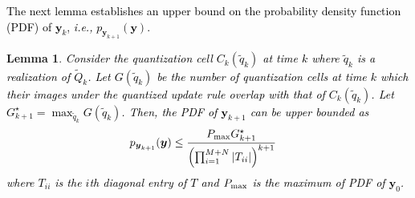 \documentclass[10pt,twocolumn,twoside]{IEEEtran}
\newtheorem{lemma}{Lemma}
\begin{document}
\textcolor{black}{The next lemma establishes an upper bound on the probability density function (PDF) of ${\ensuremath{\boldsymbol{{y}}}}_k$, \emph{i.e.,} $p_{{\ensuremath{\boldsymbol{{y}}}}_{k+1}}{\left({{\ensuremath{\boldsymbol{{y}}}}}\right)}$.}
\begin{lemma}\label{Lem: DUB}
\textcolor{black}{Consider the quantization cell $C_k{\left({\tilde{q}_k}\right)}$ at time $k$ where $\tilde{q}_k$ is a realization of $\tilde{Q}_k$. Let $G{\left({{\tilde{q}_{k}}}\right)}$ be the number of  quantization cells at time $k$ which their images under the quantized update rule overlap with that of $C_k{\left({\tilde{q}_k}\right)}$. Let $G^\star_{k+1}=\max_{\tilde{q}_k}G{\left({{\tilde{q}_k}}\right)}$. Then, the PDF of ${\ensuremath{\boldsymbol{{y}}}}_{k+1}$ can be upper bounded as 
\begin{align}
&p_{{\ensuremath{\boldsymbol{{y}}}}_{k+1}}{\left({{\ensuremath{\boldsymbol{{y}}}}}\right)}\leq \frac{P_{\rm max}G_{k+1}^\star}{{\left({\prod_{i=1}^{M+N}{\left|{T_{ii}}\right|}}\right)}^{k+1}}
\end{align}
where $T_{ii}$ is the $i$th diagonal entry of $T$ and $P_{\rm max}$ is the maximum of PDF of ${\ensuremath{\boldsymbol{{y}}}}_0$.}
\end{lemma}
\end{document}

